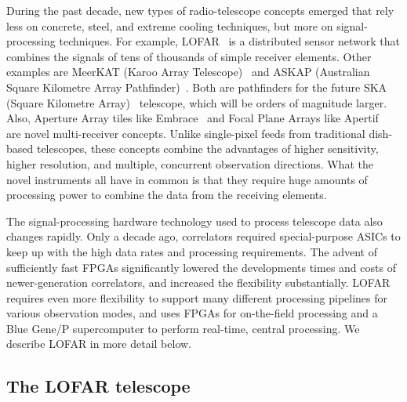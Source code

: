 \documentclass{article}
\begin{document}
During the past decade, new types of radio-telescope concepts emerged that
rely less on concrete, steel, and extreme cooling techniques, but more on
signal-processing techniques.
For example, LOFAR~\cite{Butcher:04} is a distributed sensor network
that combines the signals of tens of thousands of simple receiver elements.
Other examples are MeerKAT (Karoo Array Telescope)~\cite{meerkat} and
ASKAP (Australian Square Kilometre Array Pathfinder)~\cite{askap}. Both are
pathfinders for the future SKA (Square Kilometre Array)~\cite{ska} telescope, which
will be orders of magnitude larger.
Also, Aperture Array tiles like Embrace~\cite{embrace} and Focal Plane Arrays
like Apertif~\cite{apertif} are novel multi-receiver concepts.
Unlike single-pixel feeds from traditional dish-based telescopes, these
concepts combine the advantages of higher sensitivity, higher resolution,
and multiple, concurrent observation directions.
What the novel instruments all have in common is that they require huge
amounts of processing power to combine the data from the receiving elements.

The signal-processing hardware technology used to process telescope
data also changes rapidly.  Only a decade ago, correlators required
special-purpose ASICs to keep up with the high data rates and
processing requirements.  The advent of sufficiently fast FPGAs
significantly lowered the developments times and costs of
newer-generation correlators, and increased the flexibility
substantially. LOFAR requires even more flexibility to support many
different processing pipelines for various observation modes, and uses
FPGAs for on-the-field processing and a Blue Gene/P
supercomputer to perform real-time, central processing.
We describe LOFAR in more detail below.



\subsection{The LOFAR telescope}
\end{document}
